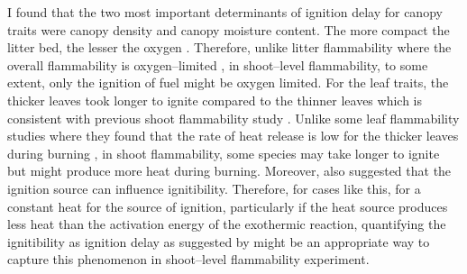 \documentclass{ttuthes2007}
\begin{document}
I found that the two most important determinants of ignition delay for canopy traits were canopy density and canopy moisture content.
The more compact the litter bed, the lesser the oxygen  \citep{scarff2006leaf, van2012species, engber2012patterns, de2012leaf,cornwell2015flammability}. %
Therefore, unlike litter flammability where the overall flammability is oxygen--limited \citep{schwilk2015dimensions}, in shoot--level flammability, to some extent, only the ignition of fuel might be oxygen limited. %
For the leaf traits, the thicker leaves took longer to ignite compared to the thinner leaves which is consistent with previous shoot flammability study \citep{alam2020shoot}.  %
Unlike some leaf flammability studies where they found that the rate of heat release is low for the thicker leaves during burning \citep{mason2016fire}, in shoot flammability, some species may take longer to ignite but might produce more heat during burning. Moreover, \citet{madrigal2012evaluation} also suggested that the ignition source can influence ignitibility. Therefore, for cases like this, for a constant heat for the source of ignition, particularly if the heat source produces less heat than the activation energy of the  exothermic reaction, quantifying the ignitibility as ignition delay as suggested by \citep{anderson1970forest} might be an appropriate way to capture this phenomenon in shoot--level flammability experiment.
\end{document}

